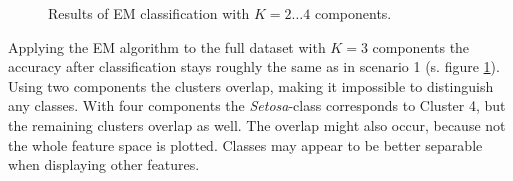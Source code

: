 \documentclass{article}
\begin{document}
\begin{figure}[!ht]
{\begin{subfigure}{0.6\textwidth}
	\end{subfigure}
	}
	\caption{Results of EM classification with $K=2\dots4$ components.}
	\label{2_2_EM_cont}
\end{figure}

Applying the EM algorithm to the full dataset with $K=3$ components the accuracy after classification stays roughly the same as in scenario 1 (s. figure \ref{2_2_EM_cont}). Using two components the clusters overlap, making it impossible to distinguish any classes. With four components the \textit{Setosa}-class corresponds to Cluster 4, but the remaining clusters overlap as well. The overlap might also occur, because not the whole feature space is plotted. Classes may appear to be better separable when displaying other features.
\end{document}
